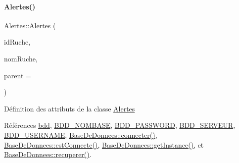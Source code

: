 \paragraph{\texorpdfstring{Alertes()}{Alertes()}}
{\footnotesize\ttfamily Alertes\+::\+Alertes (\begin{DoxyParamCaption}\item[{Q\+String}]{id\+Ruche,  }\item[{Q\+String}]{nom\+Ruche,  }\item[{\hyperlink{class_q_object}{Q\+Object} $\ast$}]{parent = {} }\end{DoxyParamCaption})\hspace{0.3cm}{\ttfamily [explicit]}}

Définition des attributs de la classe \hyperlink{class_alertes}{Alertes} 

Références \hyperlink{class_alertes_a91e58b69d29922e8e984efb767ae5268}{bdd}, \hyperlink{parametres_8h_a45f8f15b8f9a7ab4c2b219038ff64f6b}{B\+D\+D\+\_\+\+N\+O\+M\+B\+A\+SE}, \hyperlink{parametres_8h_ae2ded9166ed2553182545e97514c04f7}{B\+D\+D\+\_\+\+P\+A\+S\+S\+W\+O\+RD}, \hyperlink{parametres_8h_a423559dc987673b8aacaa9f369839bb0}{B\+D\+D\+\_\+\+S\+E\+R\+V\+E\+UR}, \hyperlink{parametres_8h_a88b5f5b81fa534553c68802384beff2c}{B\+D\+D\+\_\+\+U\+S\+E\+R\+N\+A\+ME}, \hyperlink{class_base_de_donnees_ac20da193923a9bfea5e38ee5a54820cd}{Base\+De\+Donnees\+::connecter()}, \hyperlink{class_base_de_donnees_a00388973f3ec42e5c8e76e7af7e124b2}{Base\+De\+Donnees\+::est\+Connecte()}, \hyperlink{class_base_de_donnees_a80028aa2b6b4fbf30fb2e36357b7d3d3}{Base\+De\+Donnees\+::get\+Instance()}, et \hyperlink{class_base_de_donnees_a77539baad389f5acf754cd2cd452403e}{Base\+De\+Donnees\+::recuperer()}.


